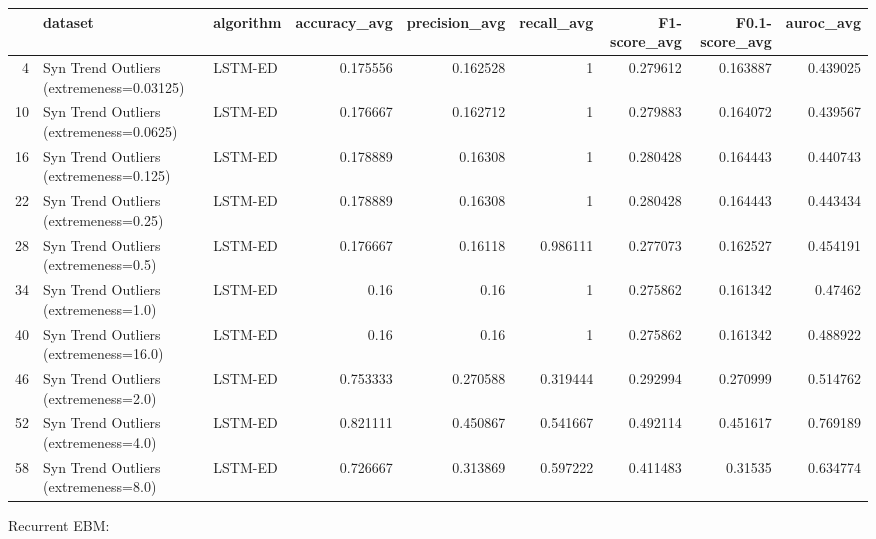 \begin{tabular}{rllrrrrrr}
\hline
    & dataset                                  & algorithm   &   accuracy\_avg &   precision\_avg &   recall\_avg &   F1-score\_avg &   F0.1-score\_avg &   auroc\_avg \\
\hline
  4 & Syn Trend Outliers (extremeness=0.03125) & LSTM-ED     &       0.175556 &        0.162528 &     1        &       0.279612 &         0.163887 &    0.439025 \\
 10 & Syn Trend Outliers (extremeness=0.0625)  & LSTM-ED     &       0.176667 &        0.162712 &     1        &       0.279883 &         0.164072 &    0.439567 \\
 16 & Syn Trend Outliers (extremeness=0.125)   & LSTM-ED     &       0.178889 &        0.16308  &     1        &       0.280428 &         0.164443 &    0.440743 \\
 22 & Syn Trend Outliers (extremeness=0.25)    & LSTM-ED     &       0.178889 &        0.16308  &     1        &       0.280428 &         0.164443 &    0.443434 \\
 28 & Syn Trend Outliers (extremeness=0.5)     & LSTM-ED     &       0.176667 &        0.16118  &     0.986111 &       0.277073 &         0.162527 &    0.454191 \\
 34 & Syn Trend Outliers (extremeness=1.0)     & LSTM-ED     &       0.16     &        0.16     &     1        &       0.275862 &         0.161342 &    0.47462  \\
 40 & Syn Trend Outliers (extremeness=16.0)    & LSTM-ED     &       0.16     &        0.16     &     1        &       0.275862 &         0.161342 &    0.488922 \\
 46 & Syn Trend Outliers (extremeness=2.0)     & LSTM-ED     &       0.753333 &        0.270588 &     0.319444 &       0.292994 &         0.270999 &    0.514762 \\
 52 & Syn Trend Outliers (extremeness=4.0)     & LSTM-ED     &       0.821111 &        0.450867 &     0.541667 &       0.492114 &         0.451617 &    0.769189 \\
 58 & Syn Trend Outliers (extremeness=8.0)     & LSTM-ED     &       0.726667 &        0.313869 &     0.597222 &       0.411483 &         0.31535  &    0.634774 \\
\hline
\end{tabular}

Recurrent EBM:

